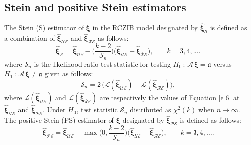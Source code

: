 \documentclass[twoside]{article}
\begin{document}
\subsection*{Stein and positive Stein estimators}
The Stein (S) estimator of
$ \boldsymbol{\xi} $
in the RCZIB model designated by
$ \hat{\boldsymbol{\xi}}_{ \mathcal{S} } $
is defined as a combination of 
$ \hat{\boldsymbol{\xi}}_{ \mathcal{UE} } $
and
$ \hat{\boldsymbol{\xi}}_{ \mathcal{RE} } $ 
as follows:
\begin{equation*}
\hat{\boldsymbol{\xi}}_{ \mathcal{S} } = \hat{\boldsymbol{\xi}}_{ \mathcal{UE} } - \Big( \frac{k - 2}{ \mathcal{S}_n} \Big)  \big (\hat{\boldsymbol{\xi}}_{ \mathcal{UE} } -  \hat{\boldsymbol{\xi}}_{ \mathcal{RE} } \big ) ,\qquad k =  3, 4, \dots .
\end{equation*}
where
$ \mathcal{S}_n $
is the likelihood ratio test statistic for testing
$ H_0 \, : \, \boldsymbol{\mathcal{A}}\, \boldsymbol{\xi} = \boldsymbol{ \mathfrak{a} } $
versus
$ H_1 \, : \, \boldsymbol{\mathcal{A}}\, \boldsymbol{\xi} \neq \boldsymbol{ \mathfrak{a} } $
given as follows:
\begin{equation*}\label{e 10}
\mathcal{S}_n  =   2\,  \Big (  \mathcal{L} ( \hat{\boldsymbol{\xi} }_{ \mathcal{UE} } ) - \mathcal{L} ( \hat{ \boldsymbol{\xi} }_{ \mathcal{RE} } )  \Big )  ,
\end{equation*}
where
$ \mathcal{L} ( \hat{\boldsymbol{\xi} }_{ \mathcal{UE} } ) $
and
$ \mathcal{L} ( \hat{ \boldsymbol{\xi} }_{ \mathcal{RE} } ) $
are respectively the values of Equation \eqref{e 6} at 
$ \hat{\boldsymbol{\xi} }_{ \mathcal{UE} } $
and
$ \hat{ \boldsymbol{\xi} }_{ \mathcal{RE} } $.
Under
$ H_0 $,
test statistic
$ \mathcal{S}_n $
distributed as
$ \chi^2 ( k ) $
when
$ n \rightarrow \infty $.
\\
The positive Stein (PS) estimator of 
$ \boldsymbol{\xi} $
designated by
$ \hat{\boldsymbol{\xi}}_{ \mathcal{PS} } $ 
is defined as follows:
\begin{equation*}
\hat{\boldsymbol{\xi}}_{ \mathcal{PS} } = \hat{\boldsymbol{\xi}}_{ \mathcal{UE} } - \max{ \Big ( 0, \frac{k - 2}{ \mathcal{S}_n} \Big ) }  \big (\hat{\boldsymbol{\xi}}_{ \mathcal{UE} } -  \hat{\boldsymbol{\xi}}_{ \mathcal{RE} } \big ) ,\qquad k =  3, 4, \dots .
\end{equation*}

\end{document}
